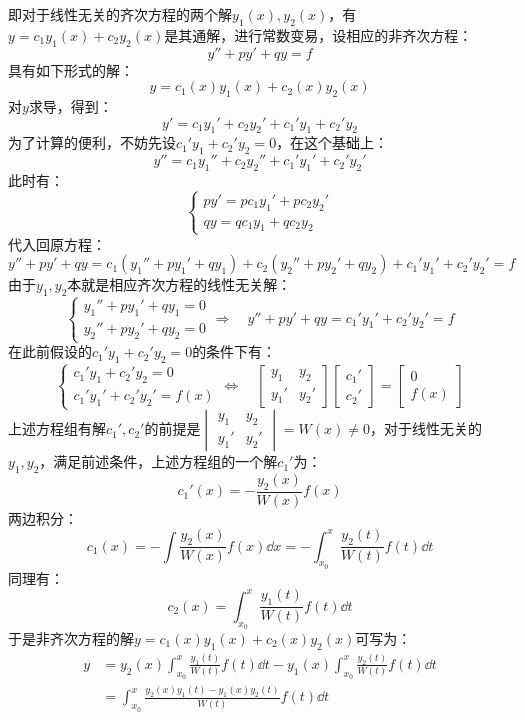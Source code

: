 即对于线性无关的齐次方程的两个解$y_1(x),y_2(x)$，有$y = c_1 y_1(x) + c_2 y_2(x)$是其通解，进行常数变易，设相应的非齐次方程：
\[y'' + py' + qy = f\]
具有如下形式的解：
\[y = c_1(x) y_1(x) + c_2(x) y_2(x)\]
对$y$求导，得到：
\[y' = c_1 y_1' + c_2 y_2' + c_1' y_1 + c_2' y_2\]
为了计算的便利，不妨先设$c_1' y_1 + c_2' y_2 = 0$，在这个基础上：
\[y'' = c_1 y_1'' + c_2 y_2'' + c_1' y_1' + c_2' y_2'\]
此时有：
\[\begin{cases}
    py' = p c_1 y_1' + p c_2 y_2' \\
    qy = q c_1 y_1 + q c_2 y_2
\end{cases}\]
代入回原方程：
\[y'' + py' + qy = c_1(y_1'' + py_1' + qy_1) + c_2(y_2'' + py_2' + qy_2) + c_1' y_1' + c_2' y_2' = f\]
由于$y_1,y_2$本就是相应齐次方程的线性无关解：
\[\begin{cases}
    y_1'' + py_1' + qy_1 = 0 \\
    y_2'' + py_2' + qy_2 = 0
\end{cases} \Rightarrow\quad y'' + py' + qy = c_1' y_1' + c_2' y_2' = f\]
在此前假设的$c_1' y_1 + c_2' y_2 = 0$的条件下有：
\[\begin{cases}
    c_1' y_1 + c_2' y_2 = 0 \\
    c_1' y_1' + c_2' y_2' = f(x)
\end{cases} \Leftrightarrow\quad \begin{bmatrix}
    y_1 & y_2 \\
    y_1' & y_2'
\end{bmatrix} \begin{bmatrix}
    c_1' \\ c_2'
\end{bmatrix} = \begin{bmatrix}
    0 \\ f(x)
\end{bmatrix}\]
上述方程组有解$c_1',c_2'$的前提是$\begin{vmatrix}
    y_1 & y_2 \\
    y_1' & y_2'
\end{vmatrix} = W(x) \neq 0$，对于线性无关的$y_1,y_2$，满足前述条件，上述方程组的一个解$c_1'$为：
\[c_1'(x) = -\frac{y_2(x)}{W(x)}f(x)\]
两边积分：
\[c_1(x) = -\int\frac{y_2(x)}{W(x)}f(x)\dd{x} = -\int_{x_0}^{x}\frac{y_2(t)}{W(t)}f(t)\dd{t}\]
同理有：
\[c_2(x) = \int_{x_0}^{x}\frac{y_1(t)}{W(t)}f(t)\dd{t}\]
于是非齐次方程的解$y = c_1(x)y_1(x) + c_2(x)y_2(x)$可写为：
\begin{align*}
    y &= y_2(x)\int_{x_0}^{x}\frac{y_1(t)}{W(t)}f(t)\dd{t} - y_1(x)\int_{x_0}^{x}\frac{y_2(t)}{W(t)}f(t)\dd{t} \\
    &= \int_{x_0}^{x}\frac{y_2(x)y_1(t) - y_1(x)y_2(t)}{W(t)}f(t)\dd{t}
\end{align*}


